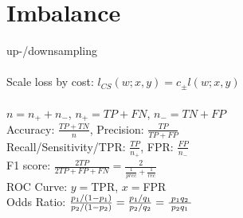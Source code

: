 \section*{Imbalance}
up-/downsampling\\
\\
Scale loss by cost: $l_{CS}(w;x,y) = c_\pm l(w;x,y)$\\
\\
$n = n_+ + n_-$, $n_+ = TP + FN$, $n_- = TN + FP$\\
Accuracy: $\frac{TP+TN}{n}$, 
Precision: $\frac{TP}{TP+FP}$\\ 
Recall/Sensitivity/TPR: $\frac{TP}{n_+}$, 
FPR: $ \frac{FP}{n_-}$\\
F1 score: $\frac{2TP}{2TP+FP+FN} = \frac{2}{\frac{1}{prec} + \frac{1}{rec}}$\\
ROC Curve: $y = $TPR, $x = $FPR\\
Odds Ratio: ${p_{1}/(1-p_{1}) \over p_{2}/(1-p_{2})}={p_{1}/q_{1} \over p_{2}/q_{2}}={\frac  {\;p_{1}q_{2}\;}{\;p_{2}q_{1}\;}}$